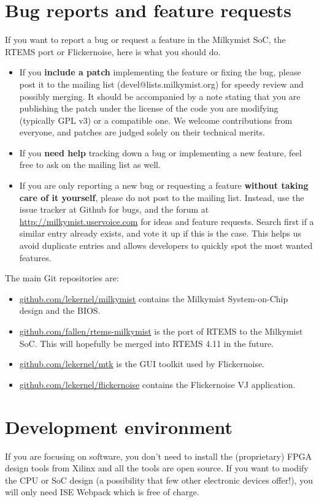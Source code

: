 \documentclass{leaflet}
\begin{document}
\section{Bug reports and feature requests}
If you want to report a bug or request a feature in the Milkymist SoC, the RTEMS port or Flickernoise, here is what you should do.
\begin{itemize}
\item If you \textbf{include a patch} implementing the feature or fixing the bug, please post it to the mailing list (devel@lists.milkymist.org) for speedy review and possibly merging. It should be accompanied by a note stating that you are publishing the patch under the license of the code you are modifying (typically GPL v3) or a compatible one. We welcome contributions from everyone, and patches are judged solely on their technical merits.
\item If you \textbf{need help} tracking down a bug or implementing a new feature, feel free to ask on the mailing list as well.
\item If you are only reporting a new bug or requesting a feature \textbf{without taking care of it yourself}, please do not post to the mailing list. Instead, use the issue tracker at Github for bugs, and the forum at \url{http://milkymist.uservoice.com} for ideas and feature requests. Search first if a similar entry already exists, and vote it up if this is the case. This helps us avoid duplicate entries and allows developers to quickly spot the most wanted features.
\end{itemize}

The main Git repositories are:
\begin{itemize}
\item \url{github.com/lekernel/milkymist} contains the Milkymist System-on-Chip design and the BIOS.
\item \url{github.com/fallen/rtems-milkymist} is the port of RTEMS to the Milkymist SoC. This will hopefully be merged into RTEMS 4.11 in the future.
\item \url{github.com/lekernel/mtk} is the GUI toolkit used by Flickernoise.
\item \url{github.com/lekernel/flickernoise} contains the Flickernoise VJ application.
\end{itemize}

\section{Development environment}
If you are focusing on software, you don't need to install the (proprietary) FPGA design tools from Xilinx and all the tools are open source. If you want to modify the CPU or SoC design (a possibility that few other electronic devices offer!), you will only need ISE Webpack which is free of charge.
\end{document}
